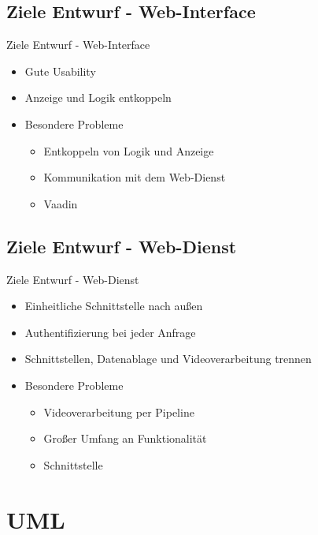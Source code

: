 \documentclass[19pt]{beamer}
\begin{document}
\subsection{Ziele Entwurf - Web-Interface}
\begin{frame}{Ziele Entwurf - Web-Interface}
    \begin{itemize}
		\item Gute Usability
		\item Anzeige und Logik entkoppeln
    	\item Besondere Probleme
    	\begin{itemize}
			\item Entkoppeln von Logik und Anzeige
			\item Kommunikation mit dem Web-Dienst
			\item Vaadin
		\end{itemize}
    \end{itemize}
\end{frame}

\subsection{Ziele Entwurf - Web-Dienst}
\begin{frame}{Ziele Entwurf - Web-Dienst}
	\begin{itemize}
		\item Einheitliche Schnittstelle nach außen
		\item Authentifizierung bei jeder Anfrage
		\item Schnittstellen, Datenablage und Videoverarbeitung trennen
		\item Besondere Probleme
		\begin{itemize}
			\item Videoverarbeitung per Pipeline
			\item Großer Umfang an Funktionalität
			\item Schnittstelle
		\end{itemize}
	\end{itemize}
\end{frame}


\section{UML}
\end{document}
